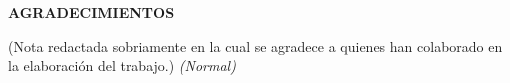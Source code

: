 \begin{center}
    \textbf{AGRADECIMIENTOS}
\end{center}
\vspace{1cm}

(Nota redactada sobriamente en la cual se agradece a quienes han colaborado en la elaboración del trabajo.) \textit{(Normal)}
\newpage